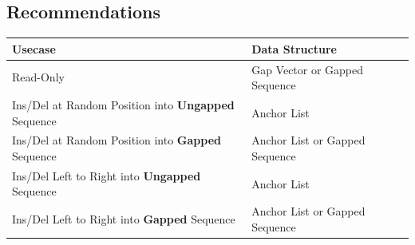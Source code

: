 \documentclass[11pt, letterpaper, twoside]{article}
\begin{document}
\subsection{Recommendations}
\begin{table}[htpb]\centering
\begin{tabular}{|l|l|l|}
\hline
\bf Usecase&\bf Data Structure\\
\hline
Read-Only&Gap Vector or Gapped Sequence\\
\hline
Ins/Del at Random Position into {\bf Ungapped} Sequence&Anchor List\\
\hline
Ins/Del at Random Position into {\bf Gapped} Sequence&Anchor List or Gapped Sequence\\
\hline
Ins/Del Left to Right into {\bf Ungapped} Sequence&Anchor List\\
\hline
Ins/Del Left to Right into {\bf Gapped} Sequence&Anchor List or Gapped Sequence\\
\hline
\end{tabular}
\end{table}
\end{document}
